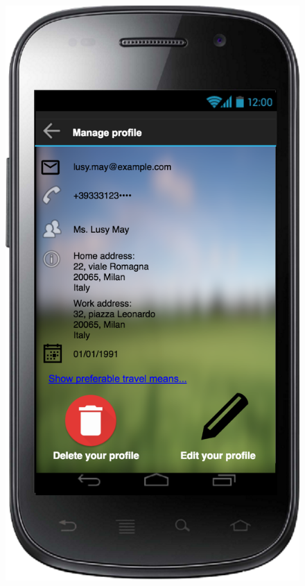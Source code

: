 \documentclass[a4paper,leqno]{article}
\begin{document}
\begin{figure}
	\begin{minipage}[!h]{0.45\linewidth}
		\centering
		\includegraphics[scale = 0.15]{manageProfile.png}
	\end{minipage}
	\hspace{0.5cm}
	\begin{minipage}[!h]{0.45\linewidth}

\end{minipage}
\end{figure}
\end{document}
